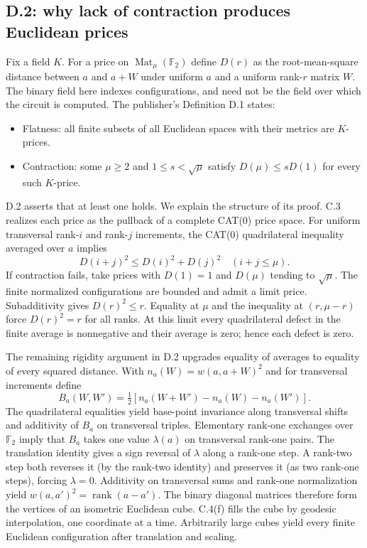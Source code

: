 \documentclass[11pt,letterpaper]{article}
\theoremstyle{definition}\newtheorem{definition}[theorem]{Definition}\newtheorem{example}[theorem]{Example}
\theoremstyle{remark}\newtheorem{remark}[theorem]{Remark}
\newcommand{\F}{\mathbb{F}}
\begin{document}
\subsection{D.2: why lack of contraction produces Euclidean prices}\label{sec:d2}
Fix a field $K$. For a price on $\operatorname{Mat}_\mu(\F_2)$ define $D(r)$ as the root-mean-square distance between $a$ and $a+W$ under uniform $a$ and a uniform rank-$r$ matrix $W$. The binary field here indexes configurations, and need not be the field over which the circuit is computed. The publisher's Definition D.1 states:
\begin{itemize}[leftmargin=1.5em,itemsep=1pt]
\item Flatness: all finite subsets of all Euclidean spaces with their metrics are $K$-prices.
\item Contraction: some $\mu\ge2$ and $1\le s<\sqrt\mu$ satisfy $D(\mu)\le sD(1)$ for every such $K$-price.
\end{itemize}
D.2 asserts that at least one holds. We explain the structure of its proof. C.3 realizes each price as the pullback of a complete CAT(0) price space. For uniform transversal rank-$i$ and rank-$j$ increments, the CAT(0) quadrilateral inequality averaged over $a$ implies
\[
 D(i+j)^2\le D(i)^2+D(j)^2 \quad (i+j\le\mu).
\]
If contraction fails, take prices with $D(1)=1$ and $D(\mu)$ tending to $\sqrt\mu$. The finite normalized configurations are bounded and admit a limit price. Subadditivity gives $D(r)^2\le r$. Equality at $\mu$ and the inequality at $(r,\mu-r)$ force $D(r)^2=r$ for all ranks. At this limit every quadrilateral defect in the finite average is nonnegative and their average is zero; hence each defect is zero.

The remaining rigidity argument in D.2 upgrades equality of averages to equality of every squared distance. With $n_a(W)=w(a,a+W)^2$ and for transversal increments define
\[
 B_a(W,W')=\tfrac12[n_a(W+W')-n_a(W)-n_a(W')].
\]
The quadrilateral equalities yield base-point invariance along transversal shifts and additivity of $B_a$ on transversal triples. Elementary rank-one exchanges over $\F_2$ imply that $B_a$ takes one value $\lambda(a)$ on transversal rank-one pairs. The translation identity gives a sign reversal of $\lambda$ along a rank-one step. A rank-two step both reverses it (by the rank-two identity) and preserves it (as two rank-one steps), forcing $\lambda=0$. Additivity on transversal sums and rank-one normalization yield $w(a,a')^2=\operatorname{rank}(a-a')$. The binary diagonal matrices therefore form the vertices of an isometric Euclidean cube. C.4(f) fills the cube by geodesic interpolation, one coordinate at a time. Arbitrarily large cubes yield every finite Euclidean configuration after translation and scaling.
\end{document}
